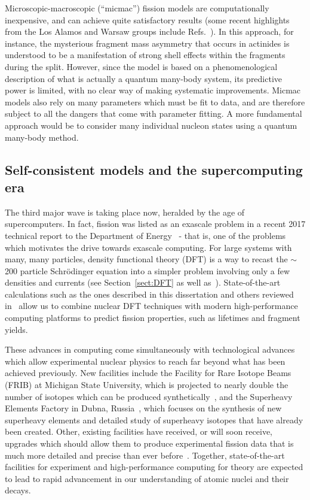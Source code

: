 Microscopic-macroscopic (``micmac'') fission models are computationally inexpensive, and can achieve quite satisfactory results (some recent highlights from the Los Alamos and Warsaw groups include Refs.~\cite{Moller2015a,Moller2015b,Jachimowicz2013,Jachimowicz2017}). In this approach, for instance, the mysterious fragment mass asymmetry that occurs in actinides is understood to be a manifestation of strong shell effects within the fragments during the split. However, since the model is based on a phenomenological description of what is actually a quantum many-body system, its predictive power is limited, with no clear way of making systematic improvements. Micmac models also rely on many parameters which must be fit to data, and are therefore subject to all the dangers that come with parameter fitting. A more fundamental approach would be to consider many individual nucleon states using a quantum many-body method. 

\subsection{Self-consistent models and the supercomputing era}
The third major wave is taking place now, heralded by the age of supercomputers. In fact, fission was listed as an exascale problem in a recent 2017 technical report to the Department of Energy~\cite{Carlson2017} - that is, one of the problems which motivates the drive towards exascale computing. For large systems with many, many particles, density functional theory (DFT) is a way to recast the ${\sim}$200 particle Schr\"{o}dinger equation into a simpler problem involving only a few densities and currents (see Section~\ref{sect:DFT} as well as~\cite{bender2003}). State-of-the-art calculations such as the ones described in this dissertation and others reviewed in~\cite{schunck2016} allow us to combine nuclear DFT techniques with modern high-performance computing platforms to predict fission properties, such as lifetimes and fragment yields.%

These advances in computing come simultaneously with technological advances which allow experimental nuclear physics to reach far beyond what has been achieved previously. New facilities include the Facility for Rare Isotope Beams (FRIB) at Michigan State University, which is projected to nearly double the number of isotopes which can be produced synthetically~\cite{Baumann2016}, and the Superheavy Elements Factory in Dubna, Russia~\cite{dmitriev2016}, which focuses on the synthesis of new superheavy elements and detailed study of superheavy isotopes that have already been created. Other, existing facilities have received, or will soon receive, upgrades which should allow them to produce experimental fission data that is much more detailed and precise than ever before~\cite{andreyev2018}. Together, state-of-the-art facilities for experiment and high-performance computing for theory are expected to lead to rapid advancement in our understanding of atomic nuclei and their decays.

